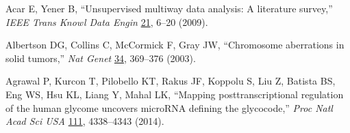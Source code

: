 
Acar E, Yener B, ``Unsupervised multiway data analysis: A literature survey,'' {\em IEEE Trans Knowl Data Engin} \underline{21}, 6--20 (2009).


Albertson DG, Collins C, McCormick F, Gray JW, ``Chromosome aberrations in solid tumors,'' {\em Nat Genet} \underline{34}, 369--376 (2003).


Agrawal P, Kurcon T, Pilobello KT, Rakus JF, Koppolu S, Liu Z, Batista BS, Eng WS, Hsu KL, Liang Y, Mahal LK, ``Mapping posttranscriptional regulation of the human glycome uncovers microRNA defining the glycocode,'' {\em Proc Natl Acad Sci USA} \underline{111}, 4338--4343 (2014).
